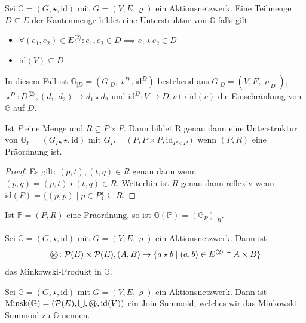 \documentclass{article}
\newcommand{\mink}{\mathbin{
  \mathchoice
    {\mbox{\normalsize\textcircled{\scriptsize M}}}
    {\mbox{\normalsize\textcircled{\scriptsize M}}}
    {\mbox{\scriptsize\textcircled{\tiny M}}}
    {\mbox{\tiny\textcircled{\fontsize{3.5}{3.5}\selectfont M}}}
  }
}
\begin{document}
\begin{definition}
  Sei $\mathbb{G} = (G, \star, \text{id})$ mit $G = (V, E, \varrho)$ ein Aktionsnetzwerk.
  Eine Teilmenge $D \subseteq E$ der Kantenmenge bildet eine Unterstruktur von $\mathbb{G}$
  falls gilt
  \begin{itemize}
    \item $\forall (e_1, e_2) \in E^{\langle 2 \rangle} \colon e_1, e_2 \in D \implies e_1 \star e_2 \in D$
    \item $\text{id}(V) \subseteq D$
  \end{itemize}
  In diesem Fall ist $\mathbb{G}_{\mid D} = (G_{\mid D}, \star^D, \text{id}^D)$
  bestehend aus $G_{\mid D} = (V, E, \varrho_{\mid D})$,
  $\star^D \colon D^{\langle 2 \rangle}, (d_1, d_2) \mapsto d_1 \star d_2$
  und $\text{id}^D \colon V \to D, v \mapsto \text{id}(v)$
  die Einschränkung von $\mathbb{G}$ auf $D$.
\end{definition}

\begin{theorem}
  Ist $P$ eine Menge und $R \subseteq P \times P$.
  Dann bildet R genau dann eine Unterstruktur von $\mathbb{G}_P = (G_P, \star, \text{id})$
  mit $G_P = (P, P \times P, \text{id}_{P \times P})$
  wenn $(P, R)$ eine Präordnung ist.
\end{theorem}
\begin{proof}
  Es gilt: $(p, t), (t, q) \in R$ genau dann wenn $(p, q) = (p, t) \star (t, q) \in R$.
  Weiterhin ist $R$ genau dann reflexiv wenn $\text{id}(P) = \{(p, p) \mid p \in P\} \subseteq R$.
\end{proof}

\begin{remark}
  Ist $\mathbb{P} = (P, R)$ eine Präordnung,
  so ist $\mathbb{G}(\mathbb{P}) = (\mathbb{G}_P)_{\mid R}$.
\end{remark}

\begin{definition}
  Sei $\mathbb{G} = (G, \star, \text{id})$ mit $G = (V, E, \varrho)$ ein Aktionsnetzwerk.
  Dann ist
  \begin{equation*}
    \mink \colon \mathcal{P}(E) \times \mathcal{P}(E), (A, B) \mapsto \{a \star b \mid (a, b) \in E^{\langle 2 \rangle} \cap A \times B\}
  \end{equation*}
  das Minkowski-Produkt in $\mathbb{G}$.
\end{definition}

\begin{definition}
  Sei $\mathbb{G} = (G, \star, \text{id})$ mit $G = (V, E, \varrho)$ ein Aktionsnetzwerk.
  Dann ist $\text{Minsk}(\mathbb{G}) = (\mathcal{P}(E), \bigcup, \mink, \text{id}(V))$
  ein Join-Summoid, welches wir das Minkowski-Summoid zu $\mathbb{G}$ nennen.
\end{definition}
\end{document}
